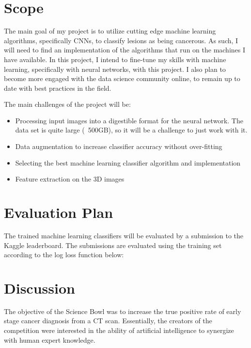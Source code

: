 \documentclass[conference,11pt]{IEEEtran}
\begin{document}
\section{Scope}

The main goal of my project is to utilize cutting edge machine learning algorithms, specifically CNNs, to classify lesions as being cancerous. As such, I will need to find an implementation of the algorithms that run on the machines I have available. In this project, I intend to fine-tune my skills with machine learning, specifically with neural networks, with this project. I also plan to become more engaged with the data science community online, to remain up to date with best practices in the field.

The main challenges of the project will be:
\begin{itemize}
  \item Processing input images into a digestible format for the neural network. The data set is quite large (~500GB), so it will be a challenge to just work with it.
  \item Data augmentation to increase classifier accuracy without over-fitting
  \item Selecting the best machine learning classifier algorithm and implementation
  \item Feature extraction on the 3D images
\end{itemize}

\section{Evaluation Plan}
The trained machine learning classifiers will be evaluated by a submission to the Kaggle leaderboard. The submissions are evaluated using the training set according to the log loss function below:

\section{Discussion}

The objective of the Science Bowl was to increase the true positive rate of early stage cancer diagnosis from a CT scan. Essentially, the creators of the competition were interested in the ability of artificial intelligence to synergize with human expert knowledge.
\end{document}
